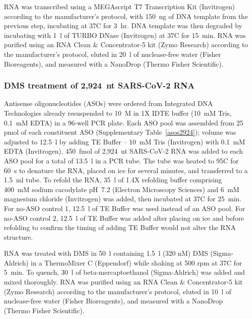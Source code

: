 \documentclass[main.tex]{subfiles}
\begin{document}
RNA was transcribed using a MEGAscript T7 Transcription Kit (Invitrogen) according to the manufacturer's protocol, with 150~ng of DNA template from the previous step, incubating at 37\textdegree C for 3~hr.
DNA template was then degraded by incubating with 1~\textmu l of TURBO DNase (Invitrogen) at 37\textdegree C for 15~min.
RNA was purified using an RNA Clean \& Concentrator-5 kit (Zymo Research) according to the manufacturer's protocol, eluted in 20~\textmu l of nuclease-free water (Fisher Bioreagents), and measured with a NanoDrop (Thermo Fisher Scientific).

\subsubsection{DMS treatment of 2,924~nt SARS-CoV-2 RNA}

Antisense oligonucleotides (ASOs) were ordered from Integrated DNA Technologies already resuspended to 10~\textmu M in 1X IDTE buffer (10~mM Tris, 0.1~mM EDTA) in a 96-well PCR plate.
Each ASO pool was assembled from 25 pmol of each constituent ASO (Supplementary Table~\ref{asos2924}); volume was adjusted to 12.5~\textmu l by adding TE Buffer -- 10~mM Tris (Invitrogen) with 0.1~mM EDTA (Invitrogen).
450~fmol of 2,924~nt SARS-CoV-2 RNA was added to each ASO pool for a total of 13.5~\textmu l in a PCR tube.
The tube was heated to 95\textdegree C for 60~s to denature the RNA, placed on ice for several minutes, and transferred to a 1.5~ml tube.
To refold the RNA, 35~\textmu l of 1.4X refolding buffer comprising 400~mM sodium cacodylate pH~7.2 (Electron Microscopy Sciences) and 6~mM magnesium chloride (Invitrogen) was added, then incubated at 37\textdegree C for 25~min.
For no-ASO control 1, 12.5~\textmu l of TE Buffer was used instead of an ASO pool.
For no-ASO control 2, 12.5~\textmu l of TE Buffer was added after placing on ice and before refolding to confirm the timing of adding TE Buffer would not alter the RNA structure.

RNA was treated with DMS in 50~\textmu l containing 1.5~\textmu l (320 nM) DMS (Sigma-Aldrich) in a ThermoMixer C (Eppendorf) while shaking at 500 rpm at 37\textdegree C for 5~min.
To quench, 30~\textmu l of beta-mercaptoethanol (Sigma-Aldrich) was added and mixed thoroughly.
RNA was purified using an RNA Clean \& Concentrator-5 kit (Zymo Research) according to the manufacturer's protocol, eluted in 10~\textmu l of nuclease-free water (Fisher Bioreagents), and measured with a NanoDrop (Thermo Fisher Scientific).
\end{document}
